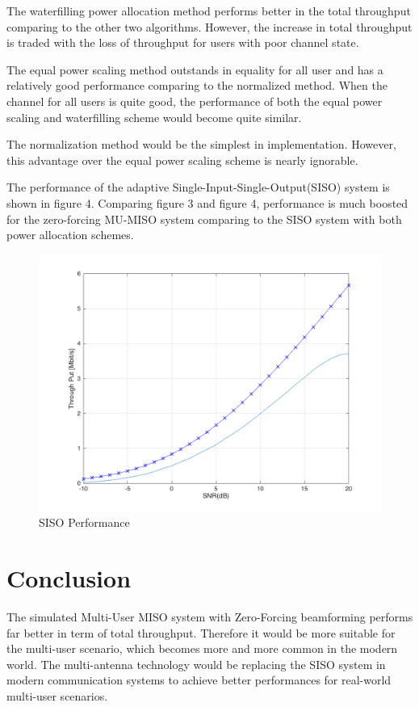 \documentclass{article}
\begin{document}
\noindent
The waterfilling power allocation method performs better in the total throughput comparing to the other two algorithms.
However, the increase in total throughput is traded with the loss of throughput for users with poor channel state.

\noindent
The equal power scaling method outstands in equality for all user and has a relatively good performance comparing to the normalized method.
When the channel for all users is quite good, the performance of both the equal power scaling and waterfilling scheme would become quite similar.

\noindent
The normalization method would be the simplest in implementation. However, this advantage over the equal power scaling scheme is nearly ignorable.

\noindent
The performance of the adaptive Single-Input-Single-Output(SISO) system is shown in figure 4. Comparing figure 3 and figure 4,
 performance is much boosted for the zero-forcing MU-MISO system comparing to the SISO system with both power allocation schemes.
\begin{figure}[ht]
\centering
\includegraphics[scale=0.4]{FadingSISO.png}
\caption{SISO Performance}
\label{fig:SISO}
\end{figure}


\section{Conclusion}
The simulated Multi-User MISO system with Zero-Forcing beamforming performs far better in term of total throughput. Therefore it would be
more suitable for the multi-user scenario, which becomes more and more common in the modern world.
The multi-antenna technology would be replacing the SISO system in modern communication systems to achieve better performances for
real-world multi-user scenarios.
\end{document}
